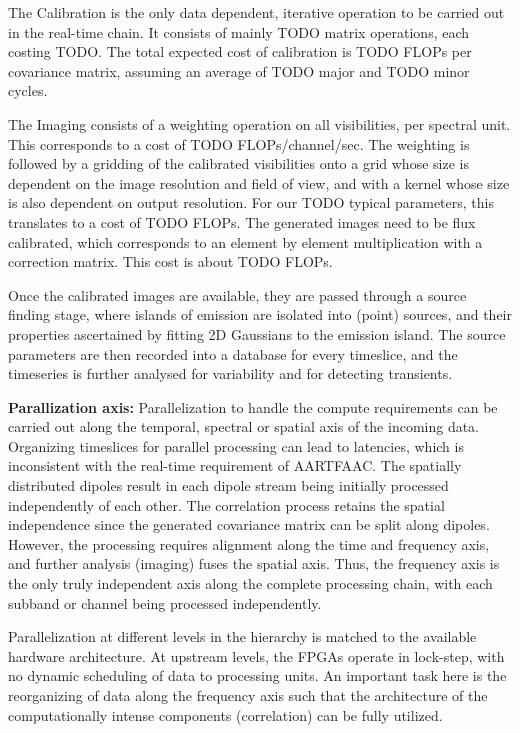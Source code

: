 \documentclass{ws-jai}
\begin{document}
The Calibration  is the only data  dependent, iterative operation to  be carried
out in the  real-time chain. It consists of mainly  TODO matrix operations, each
costing  TODO.  The  total  expected  cost of  calibration  is  TODO  FLOPs  per
covariance matrix, assuming an average of TODO major and TODO minor cycles.

The Imaging consists of a weighting  operation on all visibilities, per spectral
unit. This  corresponds to a  cost of  TODO FLOPs/channel/sec. The  weighting is
followed by a gridding of the calibrated  visibilities onto a grid whose size is
dependent on  the image resolution  and field of view,  and with a  kernel whose
size is  also dependent on output  resolution. For our TODO  typical parameters,
this translates to  a cost of TODO  FLOPs. The generated images need  to be flux
calibrated, which  corresponds to  an element by  element multiplication  with a
correction matrix. This cost is about TODO FLOPs.

Once  the calibrated  images are  available, they  are passed  through a  source
finding stage, where islands of emission  are isolated into (point) sources, and
their properties ascertained by fitting 2D Gaussians to the emission island. The
source parameters are then recorded into a database for every timeslice, and the
timeseries is further analysed for variability and for detecting transients.

\noindent \textbf  {Parallization axis:}  Parallelization to handle  the compute
requirements can be carried out along  the temporal, spectral or spatial axis of
the incoming  data.  Organizing timeslices  for parallel processing can  lead to
latencies, which is inconsistent with the real-time requirement of AARTFAAC. The
spatially  distributed dipoles  result  in each  dipole  stream being  initially
processed  independently of  each other.   The correlation  process retains  the
spatial independence  since the generated  covariance matrix can be  split along
dipoles.   However,  the  processing  requires  alignment  along  the  time  and
frequency axis,  and further analysis  (imaging) fuses the spatial  axis.  Thus,
the  frequency axis  is  the  only truly  independent  axis  along the  complete
processing chain, with each subband or channel being processed independently.

Parallelization at different levels in the hierarchy is matched to the available
hardware architecture.  At upstream levels, the FPGAs operate in lock-step, with
no dynamic scheduling of data to processing units. An important task here is the
reorganizing of data along the frequency  axis such that the architecture of the
computationally intense components (correlation) can be fully utilized.
\end{document}
